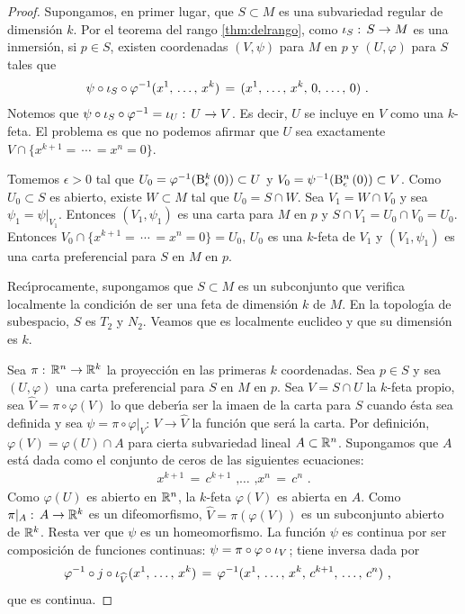 \begin{proof}
	Supongamos, en primer lugar, que $S\subset M$ es una subvariedad
	regular de dimensi\'{o}n $k$. Por el teorema del rango
	\ref{thm:delrango}, como $\inc[S]:\,S\rightarrow M$ es una
	inmersi\'{o}n, si $p\in S$, existen coordenadas $(V,\psi)$ para
	$M$ en $p$ y $(U,\varphi)$ para $S$ tales que
	\begin{align*}
		\psi\circ\inc[S]\circ\varphi^{-1}(\lista*{x}{k}) &
			\,=\,(\lista*{x}{k},\,0,\,\dots,\,0)
		\text{ .}
	\end{align*}
	Notemos que $\psi\circ\inc[S]\circ\varphi^{-1}=%
	\inc[U]:\,U\rightarrow V$. Es decir, $U$ se incluye en $V$ como
	una $k$-feta. El problema es que no podemos afirmar que $U$ sea
	exactamente $V\cap\{x^{k+1}=\,\cdots\,=x^{n}=0\}$.

	Tomemos $\epsilon>0$ tal que
	$U_{0}=\varphi^{-1}(\bola[k]{\epsilon}{0})\subset U$ y
	$V_{0}=\psi^{-1}(\bola[n]{\epsilon}{0})\subset V$. Como
	$U_{0}\subset S$ es abierto, existe $W\subset M$ tal que
	$U_{0}=S\cap W$. Sea $V_{1}=W\cap V_{0}$ y sea
	$\psi_{1}=\psi|_{V_{1}}$. Entonces $(V_{1},\psi_{1})$ es una carta
	para $M$ en $p$ y $S\cap V_{1}=U_{0}\cap V_{0}=U_{0}$. Entonces
	$V_{0}\cap\{x^{k+1}=\,\cdots\,=x^{n}=0\}=U_{0}$, $U_{0}$ es una
	$k$-feta de $V_{1}$ y $(V_{1},\psi_{1})$ es una carta preferencial
	para $S$ en $M$ en $p$.

	Rec\'{\i}procamente, supongamos que $S\subset M$ es un subconjunto
	que verifica localmente la condici\'{o}n de ser una feta de
	dimensi\'{o}n $k$ de $M$. En la topolog\'{\i}a de subespacio,
	$S$ es $T_{2}$ y $N_{2}$. Veamos que es localmente euclideo
	y que su dimensi\'{o}n es $k$.
	
	Sea $\pi:\,\bb{R}^{n}\rightarrow\bb{R}^{k}$ la proyecci\'{o}n en
	las primeras $k$ coordenadas. Sea $p\in S$ y sea $(U,\varphi)$ una
	carta preferencial para $S$ en $M$ en $p$. Sea $V=S\cap U$ la
	$k$-feta propio, sea $\widehat{V}=\pi\circ\varphi(V)$ lo que
	deber\'{\i}a ser la imaen de la carta para $S$ cuando \'{e}sta sea
	definida y sea $\psi=\pi\circ\varphi|_{V}:\,V\rightarrow\widehat{V}$
	la funci\'{o}n que ser\'{a} la carta. Por definici\'{o}n,
	$\varphi(V)=\varphi(U)\cap A$ para cierta subvariedad lineal
	$A\subset\bb{R}^{n}$. Supongamos que $A$ est\'{a} dada como
	el conjunto de ceros de las siguientes ecuaciones:
	\begin{align*}
		x^{k+1} \,=\,c^{k+1} \text{ ,}\dots\text{ ,}
		x^{n} \,=\,c^{n}
		\text{ .}
	\end{align*}
	Como $\varphi(U)$ es abierto en $\bb{R}^{n}$, la $k$-feta
	$\varphi(V)$ es abierta en $A$. Como
	$\pi|_{A}:\,A\rightarrow\bb{R}^{k}$ es un difeomorfismo,
	$\widehat{V}=\pi(\varphi(V))$ es un subconjunto abierto de
	$\bb{R}^{k}$. Resta ver que $\psi$ es un homeomorfismo. La
	funci\'{o}n $\psi$ es continua por ser composici\'{o}n de
	funciones continuas: $\psi=\pi\circ\varphi\circ\inc[V]$; tiene
	inversa dada por
	\begin{align*}
		\varphi^{-1}\circ j\circ\inc[\widehat{V}]
			(\lista*{x}{k}) & \,=\,
		\varphi^{-1}(\lista*{x}{k},\,c^{k+1},\,\dots,\,c^{n})
		\text{ ,}
	\end{align*}
	que es continua.


\end{proof}
